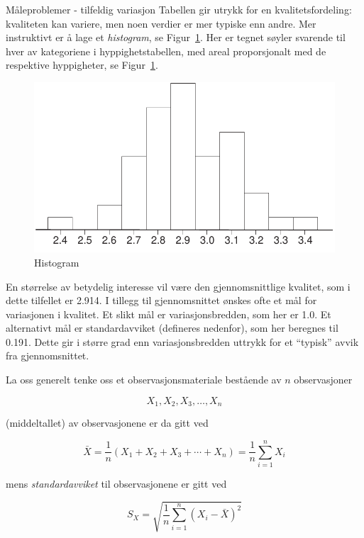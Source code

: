\begin{eksempel}{Måleproblemer - tilfeldig variasjon}
Tabellen gir utrykk for en kvalitetsfordeling:  kvaliteten kan
variere, men noen verdier er mer typiske enn andre.
Mer instruktivt er å lage et {\em histogram}, se Figur~\ref{fig:histogram}. Her er
tegnet søyler svarende til hver av kategoriene i
hyppighetstabellen, med areal proporsjonalt med de respektive hyppigheter,
se Figur~\ref{fig:histogram}.
\begin{figure}[ht]
\centering \centering
\includegraphics[scale=0.8]{figurer/fig1_2.pdf}
 \caption{Histogram}  
	\label{fig:histogram}
\end{figure}                           

En størrelse av betydelig interesse vil være den gjennomsnittlige
kvalitet, som i dette tilfellet er 2.914.  I tillegg til
gjennomsnittet ønskes ofte et mål for variasjonen i kvalitet.  Et
slikt mål er variasjonsbredden, som her er 1.0.  Et alternativt
mål er standardavviket (defineres nedenfor), som her beregnes til
0.191.  Dette gir i større grad enn variasjonsbredden uttrykk for
et ``typisk'' avvik fra gjennomsnittet.
\end{eksempel}

La oss generelt tenke oss et observasjonsmateriale bestående av $n$
observasjoner

                  \[X_{1}, X_{2}, X_{3}, \ldots ,X_{n}\]
                 
 (middeltallet) av observasjonene er da gitt ved
                                     
  \[\bar{X} = \frac{1}{n}(X_{1}+X_{2}+X_{3}+ \cdots +X_{n}) =
\frac{1}{n} \sum_{i=1}^{n}X_{i}\]

\noindent mens {\em standardavviket} til observasjonene er gitt ved

\[S_{X} = \sqrt{ \frac{1}{n}\sum_{i=1}^{n}(X_{i}-\bar{X})^{2}}\]


